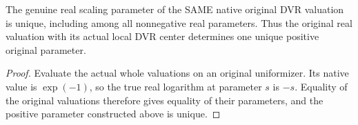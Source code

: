 \begin{lemma}
\label{lem:actual-local-dvr-real-scale-unique}
\leanok
The genuine real scaling parameter of the SAME native original DVR
valuation is unique, including among all nonnegative real parameters.
Thus the original real valuation with its actual local DVR center determines
one unique positive original parameter.
\end{lemma}
\begin{proof}
Evaluate the actual whole valuations on an original uniformizer. Its native
value is $\exp(-1)$, so the true real logarithm at parameter $s$ is $-s$.
Equality of the original valuations therefore gives equality of their
parameters, and the positive parameter constructed above is unique.
\end{proof}
